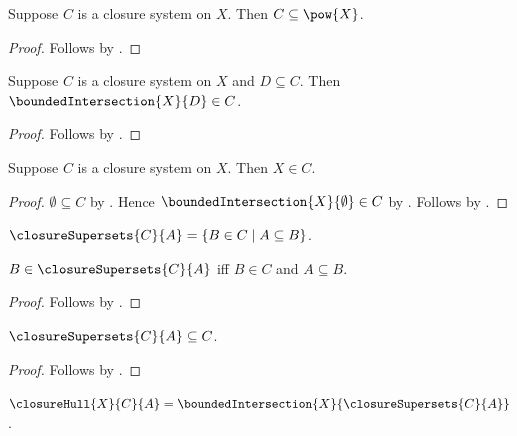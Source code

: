 \begin{proposition}\label{closure_system_bounded}
    Suppose $C$ is a closure system on $X$.
    Then $C\subseteq\pow{X}$.
\end{proposition}
\begin{proof}
    Follows by .
\end{proof}

\begin{proposition}\label{closure_system_intersection}
    Suppose $C$ is a closure system on $X$ and $D\subseteq C$.
    Then $\boundedIntersection{X}{D}\in C$.
\end{proposition}
\begin{proof}
    Follows by .
\end{proof}

\begin{proposition}\label{closure_system_top}
    Suppose $C$ is a closure system on $X$.
    Then $X\in C$.
\end{proposition}
\begin{proof}
    $\emptyset\subseteq C$ by .
    Hence $\boundedIntersection{X}{\emptyset}\in C$ by
        .
    Follows by .
\end{proof}

\begin{definition}\label{closure_supersets}
    $\closureSupersets{C}{A}=\{B\in C\mid A\subseteq B\}$.
\end{definition}

\begin{proposition}\label{closure_supersets_iff}
    $B\in\closureSupersets{C}{A}$ iff
        $B\in C$ and $A\subseteq B$.
\end{proposition}
\begin{proof}
    Follows by .
\end{proof}

\begin{proposition}\label{closure_supersets_subseteq}
    $\closureSupersets{C}{A}\subseteq C$.
\end{proposition}
\begin{proof}
    Follows by .
\end{proof}

\begin{definition}\label{closure_hull}
    $\closureHull{X}{C}{A}
        =\boundedIntersection{X}{\closureSupersets{C}{A}}$.
\end{definition}

